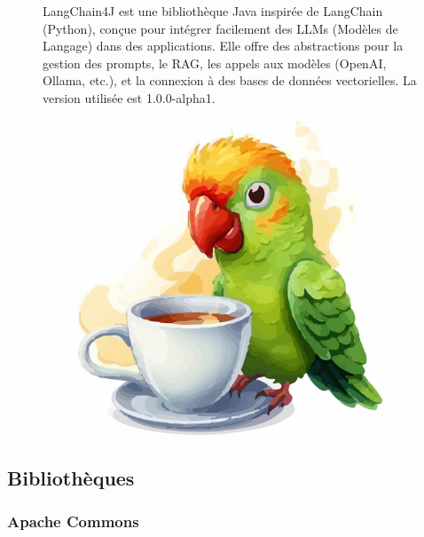 \documentclass[12pt,a4paper]{report}
\begin{document}
	\begin{figure}[H]
		\begin{minipage}{0.8\textwidth}
			LangChain4J est une bibliothèque Java inspirée de LangChain (Python), conçue pour intégrer facilement des LLMs (Modèles de Langage) dans des applications. Elle offre des abstractions pour la gestion des prompts, le RAG, les appels aux modèles (OpenAI, Ollama, etc.), et la connexion à des bases de données vectorielles. La version utilisée est 1.0.0-alpha1.
		\end{minipage}
		\hfill
		\begin{minipage}{0.15\textwidth} 
			\begin{figure}[H]
				\centering
				\includegraphics[width=\linewidth]{langchain4j-logo.png}
				\label{fig:langchain4j-logo}
			\end{figure}
		\end{minipage}
	\end{figure}
	
	\subsection{Bibliothèques}
	
	\subsubsection{Apache Commons}
	
\end{document}
